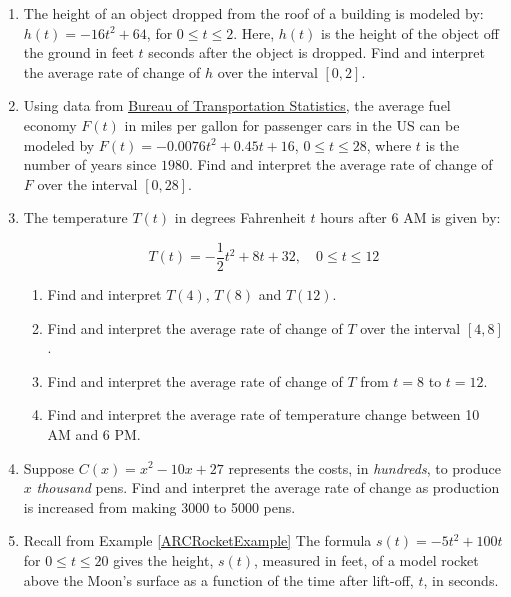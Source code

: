 \documentclass{ximera}
\begin{document}
\begin{enumerate}
\setcounter{enumi}{\value{HW}}

\item  The height of an object dropped from the roof of a building is modeled by:  $h(t) = -16t^2 + 64$, for $0 \leq t \leq 2$. Here,  $h(t)$ is the height of the object off the ground in feet $t$ seconds after the object is dropped.  Find and interpret the average rate of change of $h$ over the interval $[0,2]$.

\item Using data from \href{http://www.bts.gov/publications/national_transportation_statistics/html/table_04_23.html}{\underline{Bureau of Transportation Statistics}}, the average fuel economy $F(t)$ in miles per gallon for passenger cars in the US can be modeled by  $F(t) = -0.0076t^2+0.45t + 16$, $0 \leq t \leq 28$, where $t$ is the number of years since $1980$. Find and interpret the average rate of change of $F$ over the interval $[0,28]$.



\item  The temperature $T(t)$ in degrees Fahrenheit $t$ hours after 6 AM is given by:

\[ T(t) = -\frac{1}{2} t^2 + 8t+32, \quad 0 \leq t \leq 12\]

\begin{enumerate}

\item  Find and interpret $T(4)$, $T(8)$ and $T(12)$.

\item  Find and interpret the average rate of change of $T$ over the interval $[4,8]$.

\item  Find and interpret the average rate of change of $T$ from $t=8$ to $t=12$.

\item  Find and interpret the average rate of temperature change between 10 AM and 6 PM.

\end{enumerate}

\item  Suppose $C(x) = x^2-10x+27$ represents the costs, in \textit{hundreds}, to produce $x$ \textit{thousand} pens.  Find and interpret the average rate of change as production is increased from making 3000 to 5000 pens.


\item \label{IRCRocketExercise} Recall from Example \ref{ARCRocketExample} The formula $s(t) = -5t^2+100t$ for $0 \leq t \leq 20$ gives the height, $s(t)$, measured in feet, of a model rocket above the Moon's surface as a function of the time after lift-off, $t$, in seconds.


\end{enumerate}
\end{document}
